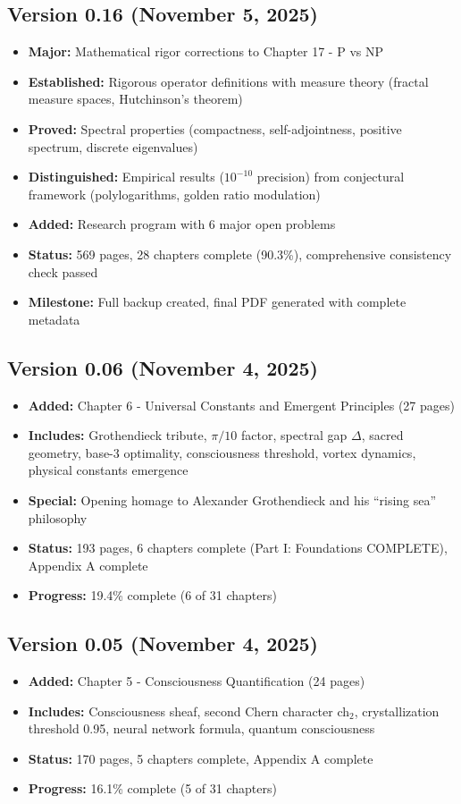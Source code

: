 \subsection*{Version 0.16 (November 5, 2025)}
\begin{itemize}
\item \textbf{Major:} Mathematical rigor corrections to Chapter 17 - P vs NP
\item \textbf{Established:} Rigorous operator definitions with measure theory (fractal measure spaces, Hutchinson's theorem)
\item \textbf{Proved:} Spectral properties (compactness, self-adjointness, positive spectrum, discrete eigenvalues)
\item \textbf{Distinguished:} Empirical results ($10^{-10}$ precision) from conjectural framework (polylogarithms, golden ratio modulation)
\item \textbf{Added:} Research program with 6 major open problems
\item \textbf{Status:} 569 pages, 28 chapters complete (90.3\%), comprehensive consistency check passed
\item \textbf{Milestone:} Full backup created, final PDF generated with complete metadata
\end{itemize}

\subsection*{Version 0.06 (November 4, 2025)}
\begin{itemize}
\item \textbf{Added:} Chapter 6 - Universal Constants and Emergent Principles (27 pages)
\item \textbf{Includes:} Grothendieck tribute, $\pi/10$ factor, spectral gap $\Delta$, sacred geometry, base-3 optimality, consciousness threshold, vortex dynamics, physical constants emergence
\item \textbf{Special:} Opening homage to Alexander Grothendieck and his ``rising sea'' philosophy
\item \textbf{Status:} 193 pages, 6 chapters complete (Part I: Foundations COMPLETE), Appendix A complete
\item \textbf{Progress:} 19.4\% complete (6 of 31 chapters)
\end{itemize}

\subsection*{Version 0.05 (November 4, 2025)}
\begin{itemize}
\item \textbf{Added:} Chapter 5 - Consciousness Quantification (24 pages)
\item \textbf{Includes:} Consciousness sheaf, second Chern character ch$_2$, crystallization threshold 0.95, neural network formula, quantum consciousness
\item \textbf{Status:} 170 pages, 5 chapters complete, Appendix A complete
\item \textbf{Progress:} 16.1\% complete (5 of 31 chapters)
\end{itemize}

